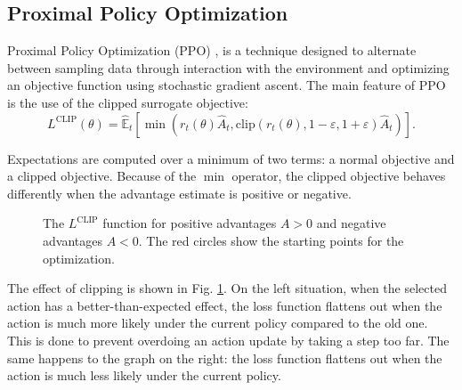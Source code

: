 \documentclass[a4paper, 12pt]{article}
\numberwithin{equation}{section}
\begin{document}
\subsection{Proximal Policy Optimization}
Proximal Policy Optimization (PPO) \cite{ppo-algorithm}, \cite{understanding-ppo} is a technique designed to alternate between sampling data through interaction with the environment and optimizing an objective function using stochastic gradient ascent. The main feature of PPO is the use of the clipped surrogate objective:
\begin{equation}
	L^\mathrm{CLIP}\left(\theta\right)=\hat{\mathbb{E}}_t\left[\min\left(r_t\left(\theta\right)\hat{A}_t,\mathrm{clip}\left(r_t\left(\theta\right),1-\varepsilon,1+\varepsilon\right)\hat{A}_t\right)\right].
\end{equation}

Expectations are computed over a minimum of two terms: a normal objective and a clipped objective. Because of the $\min$ operator, the clipped objective behaves differently when the advantage estimate is positive or negative.

\begin{figure}[h]
	\centering
		\caption{The $L^\mathrm{CLIP}$ function for positive advantages $A>0$ and negative advantages $A<0$. The red circles show the starting points for the optimization.}
	\label{fig:clipped}
\end{figure}

The effect of clipping is shown in Fig. \ref{fig:clipped}. On the left situation, when the selected action has a better-than-expected effect, the loss function flattens out when the action is much more likely under the current policy compared to the old one. This is done to prevent overdoing an action update by taking a step too far. The same happens to the graph on the right: the loss function flattens out when the action is much less likely under the current policy.
\end{document}
